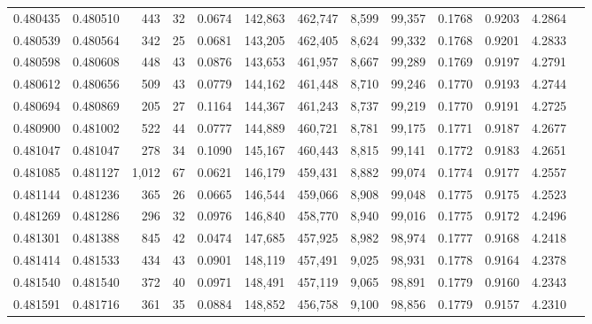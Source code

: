 \begin{tabular}{rrrrrrrrrrrrr}
0.480435 & 0.480510 &   443 &    32 &                                     0.0674 & 142,863 & 462,747 &   8,599 &  99,357 & 0.1768 & 0.9203 & 4.2864 \\
0.480539 & 0.480564 &   342 &    25 &                                     0.0681 & 143,205 & 462,405 &   8,624 &  99,332 & 0.1768 & 0.9201 & 4.2833 \\
0.480598 & 0.480608 &   448 &    43 &                                     0.0876 & 143,653 & 461,957 &   8,667 &  99,289 & 0.1769 & 0.9197 & 4.2791 \\
0.480612 & 0.480656 &   509 &    43 &                                     0.0779 & 144,162 & 461,448 &   8,710 &  99,246 & 0.1770 & 0.9193 & 4.2744 \\
0.480694 & 0.480869 &   205 &    27 &                                     0.1164 & 144,367 & 461,243 &   8,737 &  99,219 & 0.1770 & 0.9191 & 4.2725 \\
0.480900 & 0.481002 &   522 &    44 &                                     0.0777 & 144,889 & 460,721 &   8,781 &  99,175 & 0.1771 & 0.9187 & 4.2677 \\
0.481047 & 0.481047 &   278 &    34 &                                     0.1090 & 145,167 & 460,443 &   8,815 &  99,141 & 0.1772 & 0.9183 & 4.2651 \\
0.481085 & 0.481127 & 1,012 &    67 &                                     0.0621 & 146,179 & 459,431 &   8,882 &  99,074 & 0.1774 & 0.9177 & 4.2557 \\
0.481144 & 0.481236 &   365 &    26 &                                     0.0665 & 146,544 & 459,066 &   8,908 &  99,048 & 0.1775 & 0.9175 & 4.2523 \\
0.481269 & 0.481286 &   296 &    32 &                                     0.0976 & 146,840 & 458,770 &   8,940 &  99,016 & 0.1775 & 0.9172 & 4.2496 \\
0.481301 & 0.481388 &   845 &    42 &                                     0.0474 & 147,685 & 457,925 &   8,982 &  98,974 & 0.1777 & 0.9168 & 4.2418 \\
0.481414 & 0.481533 &   434 &    43 &                                     0.0901 & 148,119 & 457,491 &   9,025 &  98,931 & 0.1778 & 0.9164 & 4.2378 \\
0.481540 & 0.481540 &   372 &    40 &                                     0.0971 & 148,491 & 457,119 &   9,065 &  98,891 & 0.1779 & 0.9160 & 4.2343 \\
0.481591 & 0.481716 &   361 &    35 &                                     0.0884 & 148,852 & 456,758 &   9,100 &  98,856 & 0.1779 & 0.9157 & 4.2310 \\

\end{tabular}
